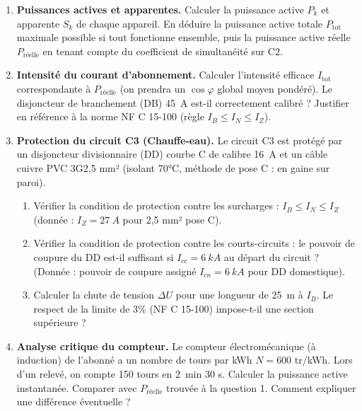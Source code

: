 \documentclass[11pt]{article}
\begin{document}
\begin{exercice}
\begin{enumerate}
\item \textbf{Puissances actives et apparentes.} 
Calculer la puissance active $P_k$ et apparente $S_k$ de chaque appareil. En déduire la puissance active totale $P_{\text{tot}}$ maximale possible si tout fonctionne ensemble, puis la puissance active réelle $P_{\text{réelle}}$ en tenant compte du coefficient de simultanéité sur C2.
\item \textbf{Intensité du courant d'abonnement.} 
Calculer l'intensité efficace $I_{\text{tot}}$ correspondante à $P_{\text{réelle}}$ (on prendra un $\cos\varphi$ global moyen pondéré). Le disjoncteur de branchement (DB) \SI{45}{A} est-il correctement calibré ? Justifier en référence à la norme NF C 15-100 (règle $I_B \le I_N \le I_Z$).
\item \textbf{Protection du circuit C3 (Chauffe-eau).} 
Le circuit C3 est protégé par un disjoncteur divisionnaire (DD) courbe C de calibre \SI{16}{A} et un câble cuivre PVC 3G2,5 mm² (isolant 70°C, méthode de pose C : en gaine sur paroi). 
\begin{enumerate}[label=\alph*)]
\item Vérifier la condition de protection contre les surcharges : $I_B \le I_N \le I_Z$ (donnée : $I_Z = \SI{27}{A}$ pour 2,5 mm² pose C). 
\item Vérifier la condition de protection contre les courts-circuits : le pouvoir de coupure du DD est-il suffisant si $I_{cc} = \SI{6}{kA}$ au départ du circuit ? (Donnée : pouvoir de coupure assigné $I_{cn} = \SI{6}{kA}$ pour DD domestique).
\item Calculer la chute de tension $\Delta U$ pour une longueur de \SI{25}{m} à $I_B$. Le respect de la limite de 3\% (NF C 15-100) impose-t-il une section supérieure ?
\end{enumerate}
\item \textbf{Analyse critique du compteur.} 
Le compteur électromécanique (à induction) de l'abonné a un nombre de tours par kWh $N = 600$ tr/kWh. Lors d'un relevé, on compte 150 tours en \SI{2}{min} 30 s. Calculer la puissance active instantanée. Comparer avec $P_{\text{réelle}}$ trouvée à la question 1. Comment expliquer une différence éventuelle ?
\end{enumerate}
\end{exercice}
\end{document}
